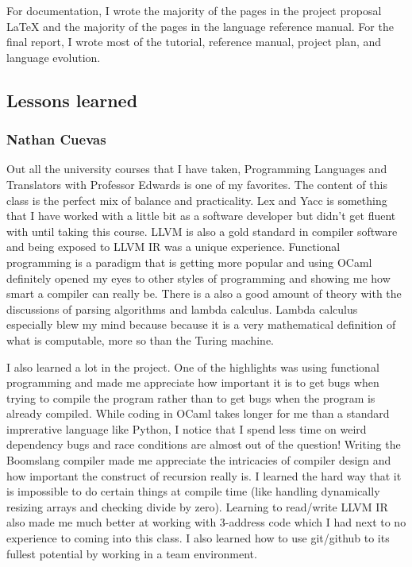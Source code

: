 \documentclass{article}
\begin{document}
For documentation, I wrote the majority of the pages in the project proposal LaTeX and the majority of the pages in the language reference manual. For the final report, I wrote most of the tutorial, reference manual, project plan, and language evolution.

\subsection{Lessons learned}
\subsubsection{Nathan Cuevas}
Out all the university courses that I have taken, Programming Languages and Translators with Professor Edwards is one of my favorites. The content of this class is the perfect mix of balance and practicality. Lex and Yacc is something that I have worked with a little bit as a software developer but didn't get fluent with until taking this course. LLVM is also a gold standard in compiler software and being exposed to LLVM IR was a unique experience. Functional programming is a paradigm that is getting more popular and using OCaml definitely opened my eyes to other styles of programming and showing me how smart a compiler can really be. There is a also a good amount of theory with the discussions of parsing algorithms and lambda calculus. Lambda calculus especially blew my mind because because it is a very mathematical definition of what is computable, more so than the Turing machine. 

I also learned a lot in the project. One of the highlights was using functional programming and made me appreciate how important it is to get bugs when trying to compile the program rather than to get bugs when the program is already compiled. While coding in OCaml takes longer for me than a standard imprerative language like Python, I notice that I spend less time on weird dependency bugs and race conditions are almost out of the question! Writing the Boomslang compiler made me appreciate the intricacies of compiler design and how important the construct of recursion really is. I learned the hard way that it is impossible to do certain things at compile time (like handling dynamically resizing arrays and checking divide by zero). Learning to read/write LLVM IR also made me much better at working with 3-address code which I had next to no experience to coming into this class. I also learned how to use git/github to its fullest potential by working in a team environment. 
\end{document}
